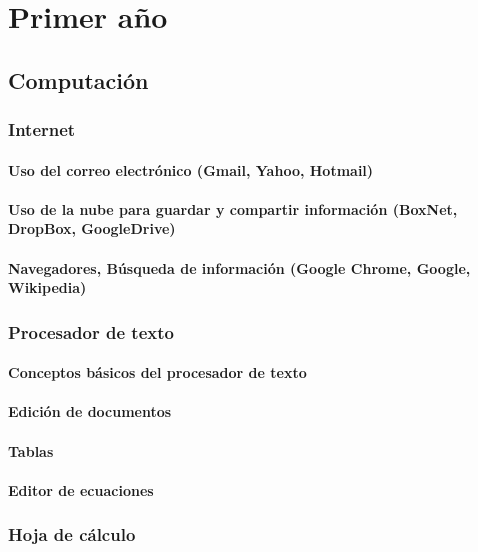 \part{Primer año}
\chapter{Computación}
\section{Internet} %
\subsection{Uso del correo electrónico (Gmail, Yahoo, Hotmail)}
\subsection{Uso de la nube para guardar y compartir información (BoxNet, DropBox, GoogleDrive)}
\subsection{Navegadores, Búsqueda de información (Google Chrome, Google, Wikipedia)}


\section{Procesador de texto} %
\subsection{Conceptos básicos del procesador de texto }
\subsection{Edición de documentos }
\subsection{Tablas }
\subsection{Editor de ecuaciones }





\section{Hoja de cálculo} %
